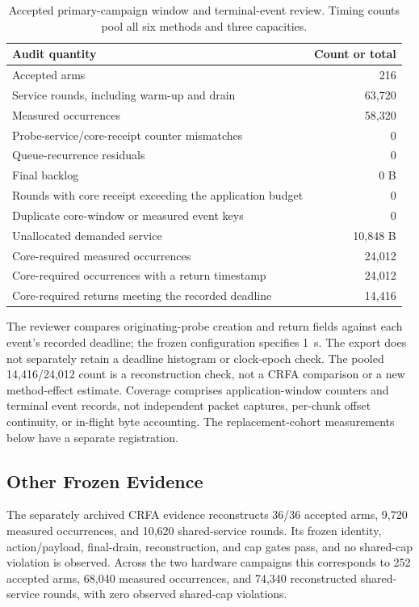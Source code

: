 \documentclass[10pt,onecolumn]{IEEEtran}
\begin{document}
\begin{table}[H]
\centering
\caption{Accepted primary-campaign window and terminal-event review.
Timing counts pool all six methods and three capacities.}
\label{tab:formal_record_review}
\small
\begin{tabular}{@{}p{}r@{}}
\toprule
Audit quantity & Count or total \\
\midrule
Accepted arms & 216 \\
Service rounds, including warm-up and drain & 63,720 \\
Measured occurrences & 58,320 \\
Probe-service/core-receipt counter mismatches & 0 \\
Queue-recurrence residuals & 0 \\
Final backlog & 0 B \\
Rounds with core receipt exceeding the application budget & 0 \\
Duplicate core-window or measured event keys & 0 \\
Unallocated demanded service & 10,848 B \\
Core-required measured occurrences & 24,012 \\
Core-required occurrences with a return timestamp & 24,012 \\
Core-required returns meeting the recorded deadline & 14,416 \\
\bottomrule
\end{tabular}
\end{table}

The reviewer compares originating-probe creation and return fields against
each event's recorded deadline; the frozen configuration specifies 1~s.
The export does not separately retain a deadline histogram or clock-epoch
check. The pooled
14,416/24,012 count is a reconstruction check, not a CRFA comparison or a new
method-effect estimate. Coverage comprises application-window counters and
terminal event records, not independent packet captures, per-chunk offset
continuity, or in-flight byte accounting. The replacement-cohort measurements below have a separate registration.

\subsection{Other Frozen Evidence}
The separately archived CRFA evidence reconstructs 36/36 accepted arms,
9,720 measured occurrences, and 10,620 shared-service rounds. Its frozen
identity, action/payload, final-drain, reconstruction, and cap gates pass, and
no shared-cap violation is observed. Across the two hardware campaigns this
corresponds to 252 accepted arms, 68,040 measured occurrences, and 74,340
reconstructed shared-service rounds, with zero observed shared-cap violations.
\end{document}
